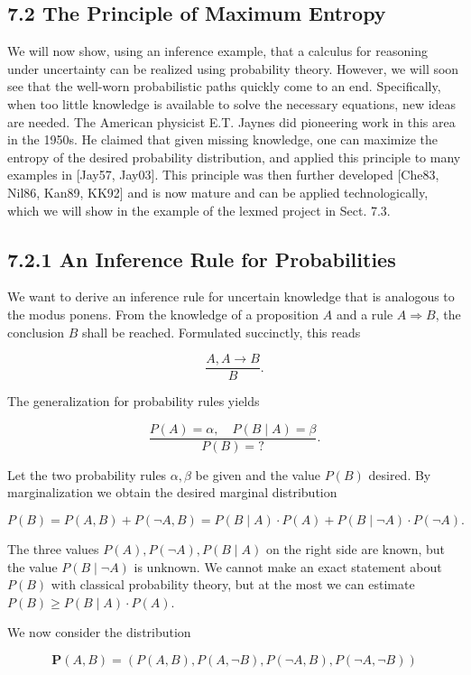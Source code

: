 \documentclass[10pt]{article}
\begin{document}
\subsection*{7.2 The Principle of Maximum Entropy}
We will now show, using an inference example, that a calculus for reasoning under uncertainty can be realized using probability theory. However, we will soon see that the well-worn probabilistic paths quickly come to an end. Specifically, when too little knowledge is available to solve the necessary equations, new ideas are needed. The American physicist E.T. Jaynes did pioneering work in this area in the 1950s. He claimed that given missing knowledge, one can maximize the entropy of the desired probability distribution, and applied this principle to many examples in [Jay57, Jay03]. This principle was then further developed [Che83, Nil86, Kan89, KK92] and is now mature and can be applied technologically, which we will show in the example of the lexmed project in Sect. 7.3.

\subsection*{7.2.1 An Inference Rule for Probabilities}
We want to derive an inference rule for uncertain knowledge that is analogous to the modus ponens. From the knowledge of a proposition $A$ and a rule $A \Rightarrow B$, the conclusion $B$ shall be reached. Formulated succinctly, this reads

$$
\frac{A, A \rightarrow B}{B} .
$$

The generalization for probability rules yields


$$
\frac{P(A)=\alpha, \quad P(B \mid A)=\beta}{P(B)=?} .
$$

Let the two probability rules $\alpha, \beta$ be given and the value $P(B)$ desired. By marginalization we obtain the desired marginal distribution

$$
P(B)=P(A, B)+P(\neg A, B)=P(B \mid A) \cdot P(A)+P(B \mid \neg A) \cdot P(\neg A) .
$$

The three values $P(A), P(\neg A), P(B \mid A)$ on the right side are known, but the value $P(B \mid \neg A)$ is unknown. We cannot make an exact statement about $P(B)$ with classical probability theory, but at the most we can estimate $P(B) \geq P(B \mid A) \cdot P(A)$.

We now consider the distribution

$$
\boldsymbol{P}(A, B)=(P(A, B), P(A, \neg B), P(\neg A, B), P(\neg A, \neg B))
$$
\end{document}
